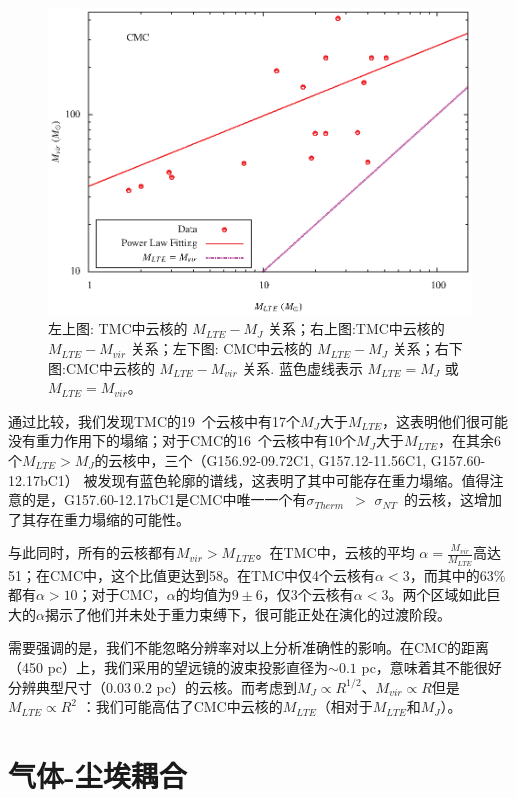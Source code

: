 \documentclass[UTF8, nocolorlinks]{pkuthss}
\newcommand{\sigmath}{$\sigma _{Therm}$\ }
\newcommand{\sigmant}{$\sigma _{NT}$\ }
\newcommand{\numcoretmc}{19\ }
\newcommand{\numcorecmc}{16\ }
\begin{document}
\begin{figure}[htbp]
			\includegraphics[totalheight=50mm]{img_plot/M_vir_cmc.eps}
			\caption{左上图: TMC中云核的 $M_{LTE}-M_{J}$ 关系；右上图:TMC中云核的 $M_{LTE}-M_{vir}$ 关系；左下图: CMC中云核的 $M_{LTE}-M_{J}$ 关系；右下图:CMC中云核的 $M_{LTE}-M_{vir}$ 关系.  蓝色虚线表示 $M_{LTE}=M_{J}$ 或 $M_{LTE}=M_{vir}$。\label{Fig.Mass}}
		\end{figure}

		通过比较，我们发现TMC的\numcoretmc 个云核中有17个$M_J$大于$M_{LTE}$，这表明他们很可能没有重力作用下的塌缩；对于CMC的\numcorecmc 个云核中有10个$M_J$大于$M_{LTE}$，在其余6个$M_{LTE}>M_J$的云核中，三个（G156.92-09.72C1, G157.12-11.56C1, G157.60-12.17bC1） 被发现有蓝色轮廓的谱线，这表明了其中可能存在重力塌缩。值得注意的是，G157.60-12.17bC1是CMC中唯一一个有\sigmath $>$ \sigmant 的云核，这增加了其存在重力塌缩的可能性。

		与此同时，所有的云核都有$M_{vir}>M_{LTE}$。在TMC中，云核的平均 $\alpha=\frac{M_{vir}}{M_{LTE}}$高达51；在CMC中，这个比值更达到58。在TMC中仅4个云核有$\alpha<3$，而其中的63\%都有$\alpha>10$；对于CMC，$\alpha$的均值为$9\pm6$，仅3个云核有$\alpha<3$。两个区域如此巨大的$\alpha$揭示了他们并未处于重力束缚下，很可能正处在演化的过渡阶段。

		需要强调的是，我们不能忽略分辨率对以上分析准确性的影响。在CMC的距离（450 pc）上，我们采用的望远镜的波束投影直径为$\sim 0.1$ pc，意味着其不能很好分辨典型尺寸（$0.03~0.2$ pc）\supercite{2007ARA&A..45..339B}的云核。而考虑到$M_{J}\propto R^{1/2}$、$M_{vir}\propto R$但是 $M_{LTE}\propto R^2$ ：我们可能高估了CMC中云核的$M_{LTE}$（相对于$M_{LTE}$和$M_{J}$）。

	\section{气体-尘埃耦合}
\end{document}
